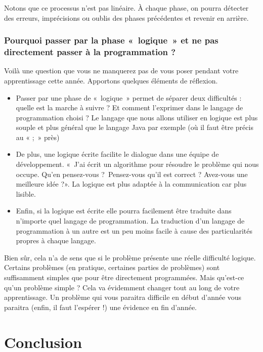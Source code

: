 	Notons que ce processus n'est pas linéaire. À chaque
	phase, on pourra détecter des erreurs, imprécisions ou oublis des
	phases précédentes et revenir en arrière.

	\subsubsection*{Pourquoi passer par la phase «~logique~» 
		et ne pas directement passer à la programmation ?}
	
	Voilà une question que vous ne manquerez pas de vous poser pendant votre
	apprentissage cette année. Apportons quelques éléments de réflexion.

	\begin{itemize}
	\item
		Passer par une phase de «~logique~» permet de séparer deux difficultés :
		quelle est la marche à suivre ? Et comment l'exprimer
		dans le langage de programmation choisi ? Le langage que nous allons
		utiliser en logique est plus souple et plus général que le langage Java
		par exemple (où il faut être précis au « ;~» près)
	\item
		De plus, une logique écrite facilite le dialogue dans une équipe de
		développement. «~J'ai écrit un algorithme pour
		résoudre le problème qui nous occupe. Qu'en
		pensez-vous ?~Pensez-vous qu'il est correct ?
		Avez-vous une meilleure idée ?». La logique est plus adaptée à la
		communication car plus lisible.
	\item
		Enfin, si la logique est écrite elle pourra facilement être traduite
		dans n'importe quel langage de programmation. La
		traduction d'un langage de programmation à un autre
		est un peu moins facile à cause des particularités propres à chaque
		langage.
	\end{itemize}

	Bien sûr, cela n'a de sens que si le problème présente
	une réelle difficulté logique. Certains problèmes (en pratique,
	certaines parties de problèmes) sont suffisamment simples que pour être
	directement programmées. Mais qu'est-ce
	qu'un problème simple ? Cela va évidemment changer
	tout au long de votre apprentissage. Un problème qui vous paraitra
	difficile en début d'année vous paraitra (enfin, il
	faut l'espérer !) une évidence en fin
	d'année.

\section{Conclusion}

